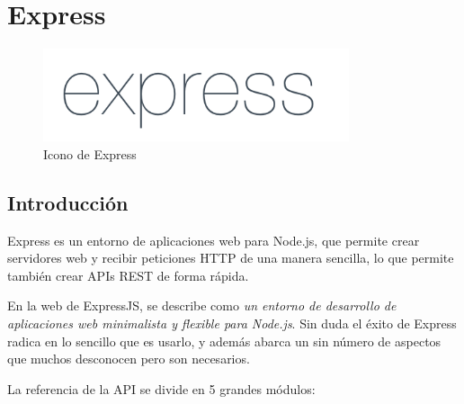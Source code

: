 \section{Express}

\begin{figure}[!h]
    \centering
    \includegraphics[width=90mm]{img/infraestructura/express2.png}
    \caption{Icono de Express}
\end{figure}

\subsection{Introducción}
Express \cite{express} es un entorno de aplicaciones web para Node.js, que permite crear servidores web y recibir peticiones HTTP de una manera sencilla, lo que permite también crear APIs REST de forma rápida.

En la web de ExpressJS, se describe como \textit{un entorno de desarrollo de aplicaciones web minimalista y flexible para Node.js}. Sin duda el éxito de Express radica en lo sencillo que es usarlo, y además abarca un sin número de aspectos que muchos desconocen pero son necesarios.

La referencia de la API se divide en 5 grandes módulos:

